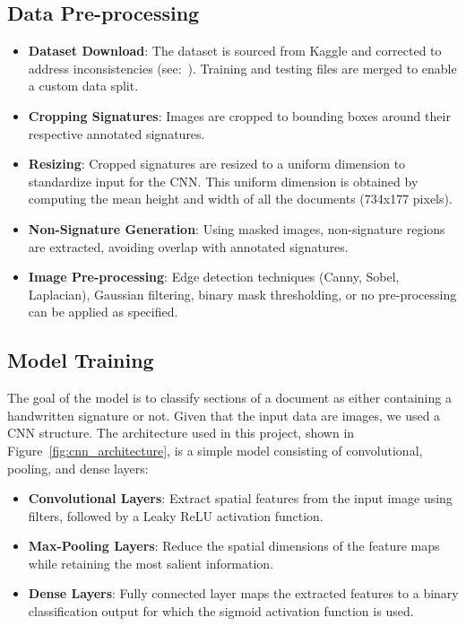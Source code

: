 \documentclass[a4paper,12pt]{article}
\begin{document}
\subsection{Data Pre-processing}
\begin{itemize}
    \item \textbf{Dataset Download}: The dataset is sourced from Kaggle\cite{dataset} and corrected to address inconsistencies (see:~\cite{dataset_fix}). Training and testing files are merged to enable a custom data split.
    \item \textbf{Cropping Signatures}: Images are cropped to bounding boxes around their respective annotated signatures.
    \item \textbf{Resizing}: Cropped signatures are resized to a uniform dimension to standardize input for the CNN. This uniform dimension is obtained by computing the mean height and width of all the documents (734x177 pixels).
    \item \textbf{Non-Signature Generation}: Using masked images, non-signature regions are extracted, avoiding overlap with annotated signatures.
    \item \textbf{Image Pre-processing}: Edge detection techniques (Canny, Sobel, Laplacian), Gaussian filtering, binary mask thresholding, or no pre-processing can be applied as specified.
\end{itemize}

\subsection{Model Training}

The goal of the model is to classify sections of a document as either containing a handwritten signature or not. Given that the input data are images, we used a CNN structure. The architecture used in this project, shown in Figure~\ref{fig:cnn_architecture}, is a simple model consisting of convolutional, pooling, and dense layers: \begin{itemize} \item \textbf{Convolutional Layers}: Extract spatial features from the input image using filters, followed by a Leaky ReLU activation function. \item \textbf{Max-Pooling Layers}: Reduce the spatial dimensions of the feature maps while retaining the most salient information. \item \textbf{Dense Layers}: Fully connected layer maps the extracted features to a binary classification output for which the sigmoid activation function is used. \end{itemize}
\end{document}
